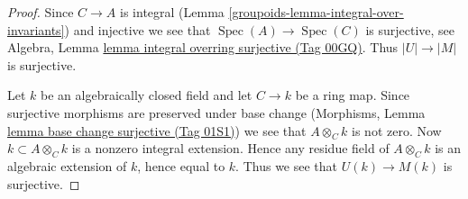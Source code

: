 \documentclass{amsart}
\theoremstyle{plain}
\theoremstyle{definition}
\theoremstyle{remark}
\numberwithin{equation}{subsection}
\def\Spec{\mathop{\mathrm{Spec}}}
\begin{document}
\begin{proof}
Since $C \to A$ is integral (Lemma \ref{groupoids-lemma-integral-over-invariants})
and injective we see that $\Spec(A) \to \Spec(C)$ is surjective, see
Algebra, Lemma \href{https://stacks.math.columbia.edu/tag/00GQ}{lemma integral overring surjective (Tag 00GQ)}.
Thus $|U| \to |M|$ is surjective.

\medskip\noindent
Let $k$ be an algebraically closed field and let $C \to k$ be a ring map.
Since surjective morphisms are preserved under base change
(Morphisms, Lemma \href{https://stacks.math.columbia.edu/tag/01S1}{lemma base change surjective (Tag 01S1)})
we see that $A \otimes_C k$ is not zero. Now $k \subset A \otimes_C k$ is a
nonzero integral extension. Hence any residue field of $A \otimes_C k$
is an algebraic extension of $k$, hence equal to $k$. Thus we see that
$U(k) \to M(k)$ is surjective.


\end{proof}
\end{document}
